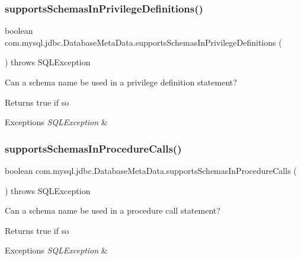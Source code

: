 \subsubsection{\texorpdfstring{supports\+Schemas\+In\+Privilege\+Definitions()}{supportsSchemasInPrivilegeDefinitions()}}
{\footnotesize\ttfamily boolean com.\+mysql.\+jdbc.\+Database\+Meta\+Data.\+supports\+Schemas\+In\+Privilege\+Definitions (\begin{DoxyParamCaption}{ }\end{DoxyParamCaption}) throws S\+Q\+L\+Exception}

Can a schema name be used in a privilege definition statement?

\begin{DoxyReturn}{Returns}
true if so 
\end{DoxyReturn}

\begin{DoxyExceptions}{Exceptions}
{\em S\+Q\+L\+Exception} & \\
\hline
\end{DoxyExceptions}
\mbox{\label{classcom_1_1mysql_1_1jdbc_1_1_database_meta_data_a02a6255ff051c5995931cbc5476074b1}} 
\subsubsection{\texorpdfstring{supports\+Schemas\+In\+Procedure\+Calls()}{supportsSchemasInProcedureCalls()}}
{\footnotesize\ttfamily boolean com.\+mysql.\+jdbc.\+Database\+Meta\+Data.\+supports\+Schemas\+In\+Procedure\+Calls (\begin{DoxyParamCaption}{ }\end{DoxyParamCaption}) throws S\+Q\+L\+Exception}

Can a schema name be used in a procedure call statement?

\begin{DoxyReturn}{Returns}
true if so 
\end{DoxyReturn}

\begin{DoxyExceptions}{Exceptions}
{\em S\+Q\+L\+Exception} & \\
\hline
\end{DoxyExceptions}
\mbox{\label{classcom_1_1mysql_1_1jdbc_1_1_database_meta_data_ad5bd8e2c13979b970e438a08515ea559}} 
